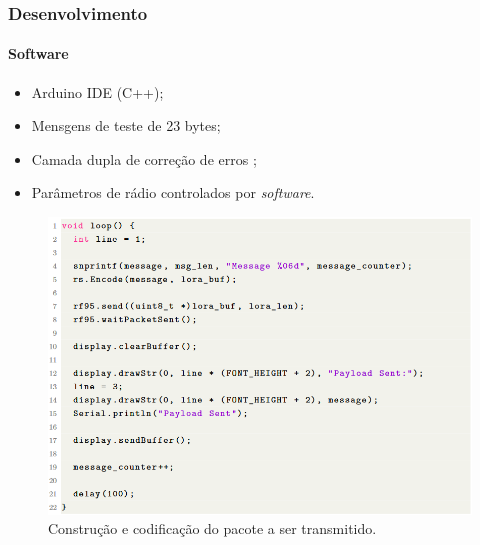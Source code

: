 \documentclass[aspectratio=169]{beamer}
\begin{document}
\begin{frame}

\frametitle{Desenvolvimento}
\framesubtitle{Software}

\begin{itemize}
    \item Arduino IDE (C++);
    \item Mensgens de teste de 23 bytes;
    \item Camada dupla de correção de erros \cite{yazdani_2021};
    \item Parâmetros de rádio controlados por \emph{software}.
\end{itemize}

\begin{figure}
  \centering
  \includegraphics[scale=0.25]{img/Code.png}
  \caption{Construção e codificação do pacote a ser transmitido.}
\end{figure}

\end{frame}
\end{document}
